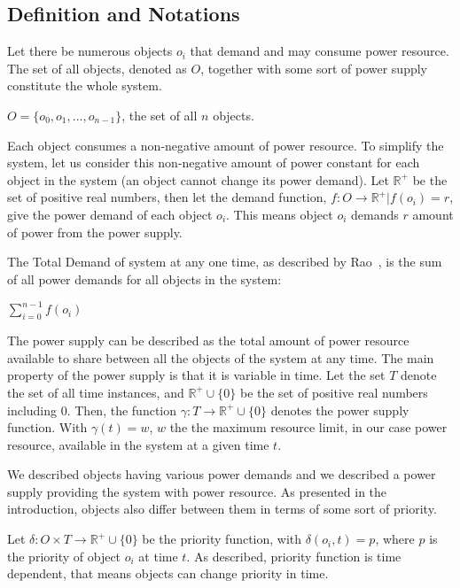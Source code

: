 \documentclass[letterpaper, 10 pt, conference]{ieeeconf}
\begin{document}
\subsection{Definition and Notations}
Let there be numerous objects $o_{i}$ that demand and may consume power resource. The set of all objects, denoted as $O$, together with some sort of power supply constitute the whole system.
 \begin{center}
    $O=\{o_{0}, o_{1}, ...,o_{n-1}\}$, the set of all $n$ objects.
 \end{center}
Each object consumes a non-negative amount of power resource. To simplify the system, let us consider this non-negative amount of power constant for each object in the system (an object cannot change its power demand). Let $\mathbb{R^+}$ be the set of positive real numbers, then let the demand function, $f:O\rightarrow\mathbb{R^+} | f(o_{i})=r$, give the power demand of each object $o_{i}$. This means object $o_{i}$ demands $r$ amount of power from the power supply.

The Total Demand of system at any one time, as described by Rao~\cite{rao2011foundation}, is the sum of all power demands for all objects in the system:
\begin{center}
   $\sum\limits_{i=0}^{n-1} f(o_i)$
\end{center}

The power supply can be described as the total amount of power resource available to share between all the objects of the system at any time. The main property of the power supply is that it is variable in time. Let the set $T$ denote the set of all time instances, and $\mathbb{R^+}\cup\{0\}$ be the set of positive real numbers including $0$. Then, the function $\gamma:T\rightarrow\mathbb{R^+}\cup\{0\}$ denotes the power supply function. With $\gamma(t)= w$, $w$ the \cite{rao2011foundation} the maximum resource limit, in our case power resource, available in the system at a given time $t$.

We described objects having various power demands and we described a power supply providing the system with power resource. As presented in the introduction, objects also differ between them in terms of some sort of priority.

Let $\delta:O\times T\rightarrow\mathbb{R^+}\cup\{0\}$ be the priority function, with $\delta(o_{i}, t)= p$, where $p$ is the priority of object $o_{i}$ at time $t$. As described, priority function is time dependent, that means objects can change priority in time.
\end{document}
